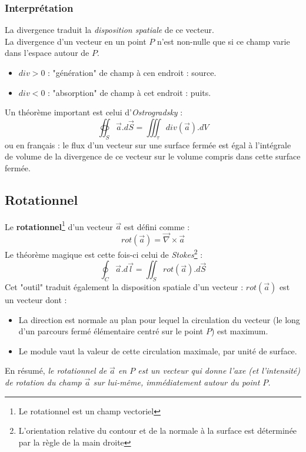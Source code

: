 \documentclass[11pt, a4paper, openany]{book}
\begin{document}
		\subsubsection{Interprétation}
		La divergence traduit la \textit{disposition spatiale} de ce vecteur.\\
		La divergence d'un vecteur en un point $P$ n'est non-nulle que si ce champ varie dans l'espace autour de $P$.
		\begin{itemize}
			\item $div > 0$ : "génération" de champ à cen endroit : source.
			\item $div < 0$ : "absorption" de champ à cet endroit : puits.
		\end{itemize}
		Un théorème important est celui d'\textit{Ostrogradsky} :
		\begin{equation}
		\oiint_S \vec{a}.d\vec{S} = \iiint_\tau div(\vec{a}).dV
		\end{equation}
		ou en français : le flux d'un vecteur sur une surface fermée est égal à l'intégrale de volume de la divergence de ce vecteur sur le volume compris dans cette surface fermée.
		
		\subsection{Rotationnel}
		Le \textbf{rotationnel}\footnote{Le rotationnel est un champ vectoriel} d'un vecteur $\vec{a}$ est défini comme :
		\begin{equation}
		rot(\vec{a}) = \vec{\nabla} \times \vec{a}
		\end{equation}
		Le théorème magique est cette fois-ci celui de \textit{Stokes}\footnote{L'orientation relative du contour et de la normale à la surface est déterminée par la règle de la main droite} : 
		\begin{equation}
		\oint_C \vec{a}.d\vec{l} = \iint_S rot(\vec{a}).d\vec{S}
		\end{equation}
		Cet "outil" traduit également la disposition spatiale d'un vecteur : $rot(\vec{a})$ est un vecteur dont :
		\begin{itemize}
			\item La direction est normale au plan pour lequel la circulation du vecteur (le long d'un parcours fermé élémentaire centré sur le point $P$) est maximum.
			\item Le module vaut la valeur de cette circulation maximale, par unité de surface.
		\end{itemize}
		En résumé, \textit{le rotationnel de $\vec{a}$ en $P$ est un vecteur qui donne l'axe (et l'intensité) de rotation du champ $\vec{a}$ sur lui-même, immédiatement autour du point $P$.}
		
\end{document}
